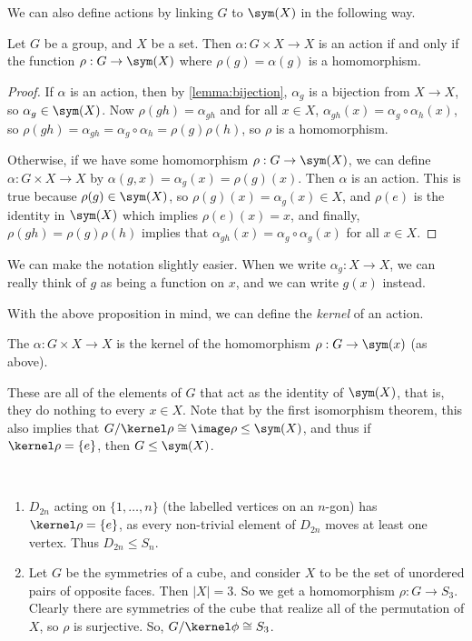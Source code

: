We can also define actions by linking $G$ to $\sym(X)$ in the following way.

\begin{proposition}
	Let $G$ be a group, and $X$ be a set. Then $\alpha: G \times X \rightarrow X$ is an action if and only if the function $\rho: G \rightarrow \sym(X)$ where $\rho(g) = \alpha(g)$ is a homomorphism.
\end{proposition}
\begin{proof}
	If $\alpha$ is an action, then by \autoref{lemma:bijection}, $\alpha_g$ is a bijection from $X \rightarrow X$, so $\alpha_g \in \sym(X)$. Now $\rho(gh) = \alpha_{gh}$ and for all $x \in X$, $\alpha_{gh}(x) = \alpha_g \circ \alpha_h (x)$, so $\rho(gh) = \alpha_{gh} = \alpha_g \circ \alpha_h = \rho(g) \rho(h)$, so $\rho$ is a homomorphism.

	Otherwise, if we have some homomorphism $\rho : G \rightarrow \sym(X)$, we can define $\alpha: G \times X \rightarrow X$ by $\alpha(g, x) = \alpha_g(x)  = \rho(g)(x)$. Then $\alpha$ is an action. This is true because $\rho(g) \in \sym(X)$, so $\rho(g)(x) = \alpha_g(x) \in X$, and $\rho(e)$ is the identity in $\sym(X)$ which implies $\rho(e)(x) = x$, and finally, $\rho(gh) = \rho(g) \rho(h)$ implies that $\alpha_{gh}(x) = \alpha_g \circ \alpha_g (x)$ for all $x \in X$.   
\end{proof}

We can make the notation slightly easier. When we write $\alpha_g : X \rightarrow X$, we can really think of $g$ as being a function on $x$, and we can write $g(x)$ instead.

With the above proposition in mind, we can define the \emph{kernel} of an action.

\begin{definition}
	The  $\alpha : G \times X \rightarrow X$ is the kernel of the homomorphism $\rho : G \rightarrow \sym(x)$ (as above).
\end{definition}
These are all of the elements of $G$ that act as the identity of $\sym(X)$, that is, they do nothing to every $x \in X$. Note that by the first isomorphism theorem, this also implies that $G/\kernel \rho \cong \image \rho \leq \sym(X)$, and thus if $\kernel \rho = \{e\}$, then $G \leq \sym(X)$.

\begin{example}~
	    \vspace*{-1.5\baselineskip}
	\begin{enumerate}[label=(\roman*)]
		\item $D_{2n}$ acting on $\{1, \dots, n\}$ (the labelled vertices on an $n$-gon) has $\kernel \rho = \{ e\}$, as every non-trivial element of $D_{2n}$ moves at least one vertex. Thus $D_{2n} \leq S_n$.
		\item Let $G$ be the symmetries of a cube, and consider $X$ to be the set of unordered pairs of opposite faces. Then $|X| = 3$. So we get a homomorphism $\rho : G \rightarrow S_3$. Clearly there are symmetries of the cube that realize all of the permutation of $X$, so $\rho$ is surjective. So, $G/\kernel \phi \cong S_3$.
	\end{enumerate}
\end{example}


